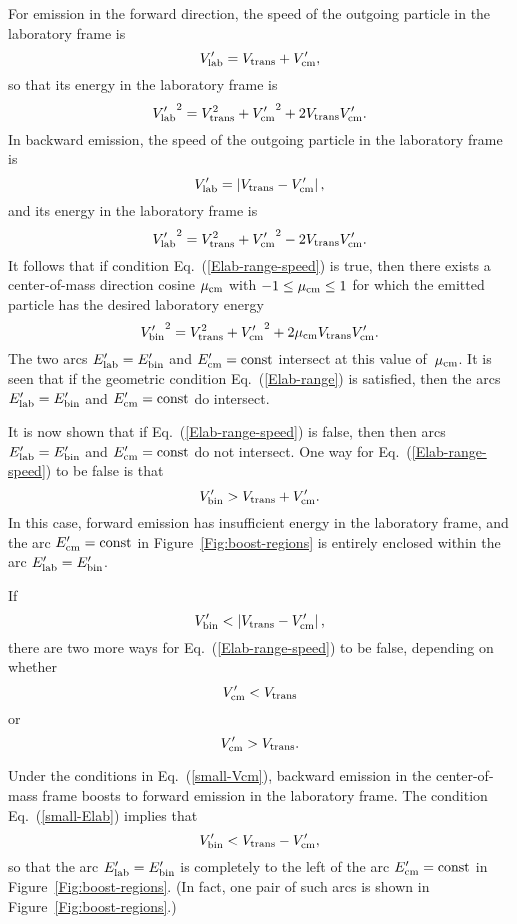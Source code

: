 For emission in the forward direction, the speed of the outgoing particle
in the laboratory frame is
$$
  V_{\text{lab}}' = V_{\text{trans}} + V_{\text{cm}}',
$$
so that its energy in the laboratory frame is
$$
  {V_{\text{lab}}'}^2 = V_{\text{trans}}^2 + {V_{\text{cm}}'}^2 + 2 V_{\text{trans}} V_{\text{cm}}'.
$$
In backward emission, the speed of the outgoing particle
in the laboratory frame is
$$
  V_{\text{lab}}' = \left| V_{\text{trans}} - V_{\text{cm}}' \right|,
$$
and its energy in the laboratory frame is
$$
  {V_{\text{lab}}'}^2 = V_{\text{trans}}^2 + {V_{\text{cm}}'}^2 - 2 V_{\text{trans}} V_{\text{cm}}'.
$$
It follows that if condition Eq.~(\ref{Elab-range-speed}) is true,
then there exists a center-of-mass direction cosine $\mu_{\text{cm}}$ with
$-1 \le \mu_{\text{cm}} \le 1$ for which the emitted particle has the
desired laboratory energy
$$
 {V_{\text{bin}}'}^2 =
  V_{\text{trans}}^2 + {V_{\text{cm}}'}^2 + 2 \mu_{\text{cm}} V_{\text{trans}} V_{\text{cm}}'.
$$
The two arcs $E_{\text{lab}}' = E_{\text{bin}}'$ and $E_{\text{cm}}' = \text{const}$ intersect at this
value of~$\mu_{\text{cm}}$.  It is seen that if the geometric condition Eq.~(\ref{Elab-range})
is satisfied, then the arcs $E_{\text{lab}}' = E_{\text{bin}}'$ and $E_{\text{cm}}' = \text{const}$ 
do intersect.

It is now shown that if Eq.~(\ref{Elab-range-speed}) is false, then then arcs 
$E_{\text{lab}}' = E_{\text{bin}}'$ and $E_{\text{cm}}' = \text{const}$ do not intersect.
One way for Eq.~(\ref{Elab-range-speed}) to be false is that
\begin{equation}
  V_{\text{bin}}' > V_{\text{trans}} + V_{\text{cm}}'.
  \label{big-Elab}
\end{equation}
In this case, forward emission has insufficient energy in the laboratory frame,
and  the arc $E_{\text{cm}}' = \text{const}$ in Figure~\ref{Fig:boost-regions}
is entirely enclosed within the arc $E_{\text{lab}}' = E_{\text{bin}}'$.

If
\begin{equation}
   V_{\text{bin}}' < \left| V_{\text{trans}} - V_{\text{cm}}' \right|,
 \label{small-Elab}
\end{equation}
there are two more ways for Eq.~(\ref{Elab-range-speed}) to be false,
depending on whether
\begin{equation}
  V_{\text{cm}}' < V_{\text{trans}}
 \label{small-Vcm}
\end{equation}
or
\begin{equation}
  V_{\text{cm}}' > V_{\text{trans}}.
 \label{small-Vtrans}
\end{equation}

Under the conditions in Eq.~(\ref{small-Vcm}),
backward emission in the center-of-mass frame boosts to forward
emission in the laboratory frame.  The condition Eq.~(\ref{small-Elab})
implies that 
$$
   V_{\text{bin}}' <  V_{\text{trans}} - V_{\text{cm}}',
$$
so that the arc $E_{\text{lab}}' = E_{\text{bin}}'$ is completely to the left of
the arc $E_{\text{cm}}' = \text{const}$ in Figure~\ref{Fig:boost-regions}.  (In fact, one pair of such
arcs is shown in Figure~\ref{Fig:boost-regions}.)

